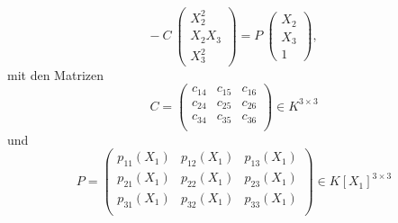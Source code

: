 \documentclass[11pt]{beamer}
\theoremstyle{custom}
\theoremstyle{custom}
\begin{document}
	\begin{frame}
		\begin{equation}\label{eqn:E3Q3_sep}
			- \ 
			C \
			\begin{pmatrix}
				X_{2}^2\\X_{2}X_{3}\\X_{3}^2
			\end{pmatrix} 
			=
			P \
			\begin{pmatrix}
				X_{2}\\X_{3}\\1
			\end{pmatrix},
		\end{equation}
		mit den Matrizen
		\begin{equation*}
			C = \begin{pmatrix}
				c_{14}&c_{15}&c_{16}\\
				c_{24}&c_{25}&c_{26}\\
				c_{34}&c_{35}&c_{36}\\
			\end{pmatrix} \in K^{3 \times 3}
		\end{equation*}
		und
		\begin{equation*}
			P = \begin{pmatrix}p_{11}\left(X_{1}\right)&p_{12}\left(X_{1}\right)&p_{13}\left(X_{1}\right)\\
				p_{21}\left(X_{1}\right)&p_{22}\left(X_{1}\right)&p_{23}\left(X_{1}\right)\\
				p_{31}\left(X_{1}\right)&p_{32}\left(X_{1}\right)&p_{33}\left(X_{1}\right)\\
			\end{pmatrix} \in K[X_1]^{3 \times 3}
		\end{equation*}
	\end{frame}
\end{document}
